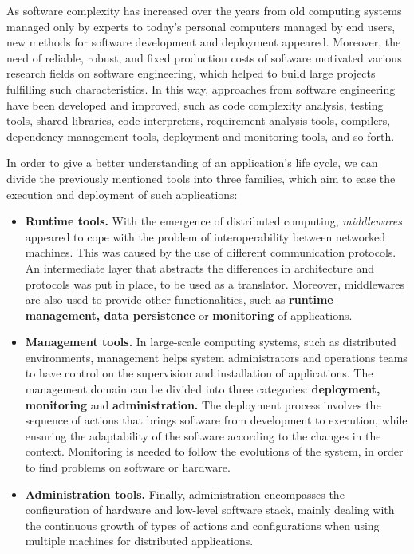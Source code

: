 As software complexity has increased over the years from old computing systems managed only by experts to today's personal computers managed by end users, new methods for software development and deployment appeared.
Moreover, the need of reliable, robust, and fixed production costs of software motivated various research fields on software engineering, which helped to build large projects fulfilling such characteristics.
In this way, approaches from software engineering have been developed and improved, such as code complexity analysis, testing tools, shared libraries, code interpreters, requirement analysis tools, compilers, dependency management tools, deployment and monitoring tools, and so forth.

In order to give a better understanding of an application's life cycle, we can divide the previously mentioned tools into three families, which aim to ease the execution and deployment of such applications:
\begin{itemize}
	\item \textbf{Runtime tools.} With the emergence of distributed computing, \textit{middlewares} appeared to cope with the problem of interoperability between networked machines.
	This was caused by the use of different communication protocols.
	An intermediate layer that abstracts the differences in architecture and protocols was put in place, to be used as a translator.
	Moreover, middlewares are also used to provide other functionalities, such as \textbf{runtime management, data persistence} or \textbf{monitoring} of applications.
	\item \textbf{Management tools.} In large-scale computing systems, such as distributed environments, management helps system administrators and operations teams to have control on the supervision and installation of applications.
	The management domain can be divided into three categories: \textbf{deployment, monitoring} and \textbf{administration.}
	The deployment process involves the sequence of actions that brings software from development to execution, while ensuring the adaptability of the software according to the changes in the context.
	Monitoring is needed to follow the evolutions of the system, in order to find problems on software or hardware.
	\item \textbf{Administration tools.} Finally, administration encompasses the configuration of hardware and low-level software stack, mainly dealing with the continuous growth of types of actions and configurations when using multiple machines for distributed applications.
\end{itemize}

